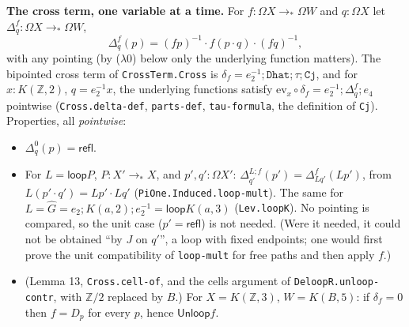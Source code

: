 \documentclass[11pt]{amsart}
\theoremstyle{definition}
\theoremstyle{remark}
\newcommand{\Om}{\Omega}
\newcommand{\code}[1]{\texttt{#1}}
\newcommand{\refl}{\mathsf{refl}}
\newcommand{\Unloop}{\mathsf{Unloop}}
\newcommand{\lp}{\mathsf{loop}}
\newcommand{\Z}{\mathbb{Z}}
\begin{document}
\noindent\textbf{The cross term, one variable at a time.} For
$f:\Om X\to_*\Om W$ and $q:\Om X$ let $\Delta^f_q:\Om X\to_*\Om W$,
\[
  \Delta^f_q(p)=(fp)^{-1}\cdot f(p\cdot q)\cdot (fq)^{-1},
\]
with any pointing (by ($\lambda$0) below only the underlying function matters).
The bipointed cross term of \code{CrossTerm.Cross} is
$\delta_f=e_2^{-1};\code{Dhat};\tau;\code{Cj}$, and for $x:K(\Z,2)$, $q=e_2^{-1}x$,
the underlying functions satisfy
$\mathrm{ev}_x\circ\delta_f=e_2^{-1};\Delta^f_q;e_4$ pointwise
(\code{Cross.delta-def}, \code{parts-def}, \code{tau-formula}, the definition of
\code{Cj}). Properties, all \emph{pointwise}:
\begin{itemize}
\item[($\Delta$0)] $\Delta^0_q(p)=\refl$.
\item[($\Delta$1)] For $L=\lp P$, $P:X'\to_*X$, and $p',q':\Om X'$:
$\Delta^{L;f}_{q'}(p')=\Delta^f_{Lq'}(Lp')$, from $L(p'\cdot q')=Lp'\cdot Lq'$
(\code{PiOne.Induced.loop-mult}). The same for $L=\hat G=e_2;K(a,2);e_2^{-1}=\lp
K(a,3)$ (\code{Lev.loopK}). No pointing is compared, so the unit case
($p'=\refl$) is not needed. (Were it needed, it could not be obtained ``by $J$
on $q'$'', a loop with fixed endpoints; one would first prove the unit
compatibility of \code{loop-mult} for free paths and then apply $f$.)
\item[($\delta$2)] (Lemma 13, \code{Cross.cell-of}, and the cells argument of
\code{DeloopR.unloop-contr}, with $\Z/2$ replaced by $B$.) For $X=K(\Z,3)$,
$W=K(B,5)$: if $\delta_f=0$ then $f=D_p$ for every $p$, hence $\Unloop f$.
\end{itemize}
\end{document}
